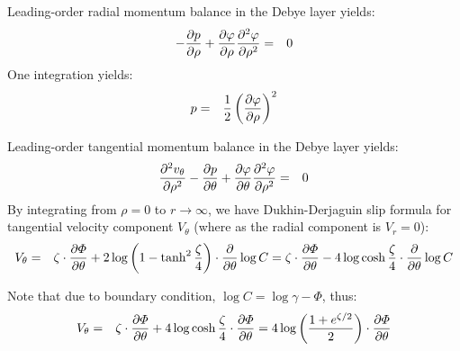 Leading-order radial momentum balance in the Debye layer yields:
\begin{eqnarray} \nonumber
- \frac{\partial p}{\partial \rho} + \frac{\partial \varphi}{\partial \rho} \frac{\partial ^2\varphi}{\partial \rho^2} &=& 0
\end{eqnarray}
One integration yields:
\begin{eqnarray} \nonumber
p &=& \frac{1}{2}\left(\frac{\partial \varphi}{\partial \rho}\right)^2
\end{eqnarray}

Leading-order tangential momentum balance in the Debye layer yields:
\begin{eqnarray} \nonumber
\frac{\partial ^2 v_\theta}{\partial \rho^2} - \frac{\partial p}{\partial \theta} 
 + \frac{\partial \varphi}{\partial \theta} \frac{\partial ^2\varphi}{\partial \rho^2} &=& 0
\end{eqnarray}
By integrating from $\rho = 0$ to $r \rightarrow \infty$, we have Dukhin-Derjaguin slip formula
for tangential velocity component $V_\theta$ (where as the radial component is $V_r = 0$):
\begin{eqnarray}
V_\theta &=& \zeta \cdot \frac{\partial \varPhi}{\partial \theta} + 
      2\log\left(1 - \tanh^2 \frac{\zeta}{4}\right) \cdot \frac{\partial }{\partial \theta} \log C 
 = \zeta \cdot \frac{\partial \varPhi}{\partial \theta} -
      4\log\cosh \frac{\zeta}{4} \cdot \frac{\partial }{\partial \theta} \log C
\end{eqnarray}

Note that due to boundary condition, $\log C = \log\gamma -\varPhi$, thus:
\begin{eqnarray}
V_\theta &=& \zeta \cdot \frac{\partial \varPhi}{\partial \theta} + 
      4\log\cosh \frac{\zeta}{4} \cdot \frac{\partial \varPhi}{\partial \theta} = 
4\log\left(\frac{1 + e^{\zeta/2}}{2}\right) \cdot \frac{\partial \varPhi}{\partial \theta}
\end{eqnarray}

